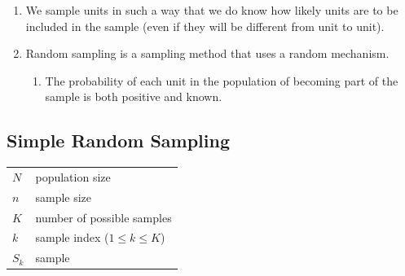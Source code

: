 \begin{enumerate}
    \item We sample units in such a way that we do know how likely units are to be included in the sample (even if they will be different from unit to unit).
    \hfill \cite{statistics/book/Statistics-for-Data-Scientists/Maurits-Kaptein}

    \item Random sampling is a sampling method that uses a random mechanism. 
    \hfill \cite{statistics/book/Statistics-for-Data-Scientists/Maurits-Kaptein}

    \begin{enumerate}
        \item The probability of each unit in the population of becoming part of the sample is both positive and known.
        \hfill \cite{statistics/book/Statistics-for-Data-Scientists/Maurits-Kaptein}


        
    \end{enumerate}
\end{enumerate}



\subsection{Simple Random Sampling \cite{statistics/book/Statistics-for-Data-Scientists/Maurits-Kaptein}}\label{Sampling Plans/Representative Sampling/Simple Random Sampling}

\begin{table}[H]
    \centering
    \begin{tabular}{l l}
        $N$ & population size \\
        $n$ & sample size \\
        $K$ & number of possible samples \\
        $k$ & sample index ($1 \leq k \leq K$) \\
        $S_k$ & sample\\
    \end{tabular}
\end{table}

